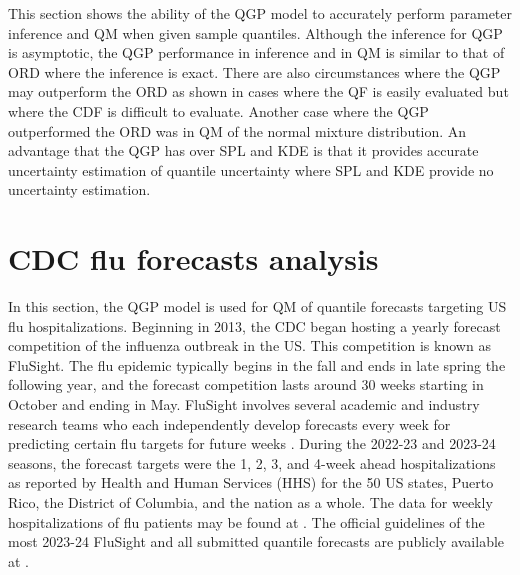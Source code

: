 \documentclass[preprint,12pt,authoryear]{elsarticle}
\begin{document}
This section shows the ability of the QGP model to accurately perform parameter inference and QM when given sample quantiles. Although the inference for QGP is asymptotic, the QGP performance in inference and in QM is similar to that of ORD where the inference is exact. There are also circumstances where the QGP may outperform the ORD as shown in cases where the QF is easily evaluated but where the CDF is difficult to evaluate. Another case where the QGP outperformed the ORD was in QM of the normal mixture distribution. An advantage that the QGP has over SPL and KDE is that it provides accurate uncertainty estimation of quantile uncertainty where SPL and KDE provide no uncertainty estimation.











\section{CDC flu forecasts analysis} \label{sec:qm_analysis}


In this section, the QGP model is used for QM of quantile forecasts targeting US flu hospitalizations. Beginning in 2013, the CDC began hosting a yearly forecast competition of the influenza outbreak in the US. This competition is known as FluSight. The flu epidemic typically begins in the fall and ends in late spring the following year, and the forecast competition lasts around 30 weeks starting in October and ending in May. FluSight involves several academic and industry research teams who each independently develop forecasts  every week for predicting certain flu targets for future weeks \cite[]{biggerstaff2016results}. During the 2022-23 and 2023-24 seasons, the forecast targets were the 1, 2, 3, and 4-week ahead hospitalizations as reported by Health and Human Services (HHS) for the 50 US states, Puerto Rico, the District of Columbia, and the nation as a whole. The data for weekly hospitalizations of flu patients may be found at \cite{healthdata2024covidts}. The official guidelines of the most 2023-24 FluSight and all submitted quantile forecasts are publicly available at \cite{mathis2023flusight} \cite[]{mathis2024evaluation}. 
\end{document}
